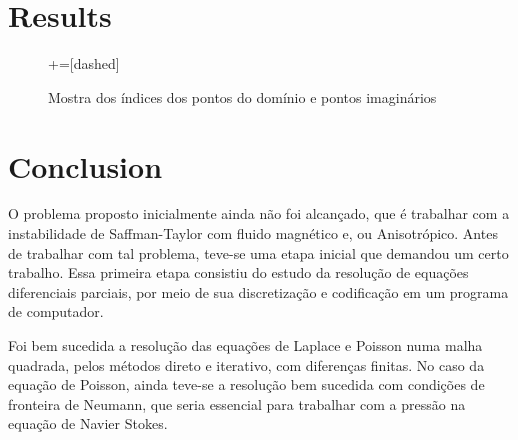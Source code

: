 \documentclass[journal]{IEEEtran}
\begin{document}
\section{Results}



\begin{figure}
\centering
{}+=[dashed]%
\caption{Mostra dos índices dos pontos do domínio e pontos imaginários\label{uma_malha}}
\end{figure}
\section{Conclusion}

O problema proposto inicialmente ainda não foi alcançado, que é trabalhar com a instabilidade de Saffman-Taylor com fluido magnético e, ou Anisotrópico. Antes de trabalhar com tal problema, teve-se uma etapa inicial que demandou um certo trabalho. Essa primeira etapa consistiu do estudo da resolução de equações diferenciais parciais, por meio de sua discretização e codificação em um programa de computador.

Foi bem sucedida a resolução das equações de Laplace e Poisson numa malha quadrada, pelos métodos direto e iterativo, com diferenças finitas. No caso da equação de Poisson, ainda teve-se a resolução bem sucedida com condições de fronteira de Neumann, que seria essencial para trabalhar com a pressão na equação de Navier Stokes.
\end{document}
